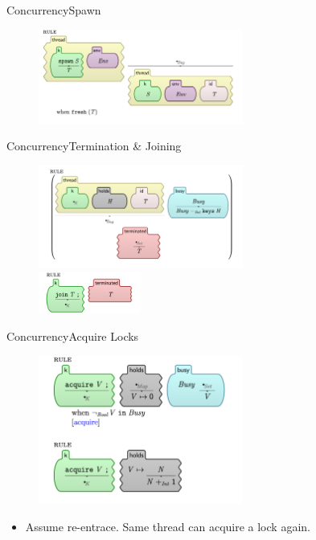 \documentclass{beamer}
\begin{document}
\begin{frame}{Concurrency}{Spawn}
    \begin{figure}[H]
        \centering
    \includegraphics[width=0.6\textwidth]{thread-creation} \\
    \end{figure}
\end{frame}
\begin{frame}{Concurrency}{Termination \& Joining}
    \begin{figure}[H]
        \centering
    \includegraphics[width=0.6\textwidth]{thread-termination} \\
    \includegraphics[width=0.3\textwidth]{thread-join} \\
    \end{figure}
\end{frame}
\begin{frame}{Concurrency}{Acquire Locks}
    \begin{figure}[H]
        \centering
    \includegraphics[width=0.6\textwidth]{acquire-lock.png} \\
    \end{figure}
    \pause
    \begin{itemize}
        \item Assume re-entrace. Same thread can acquire a lock
            again.
    \end{itemize}
\end{frame}
\end{document}
